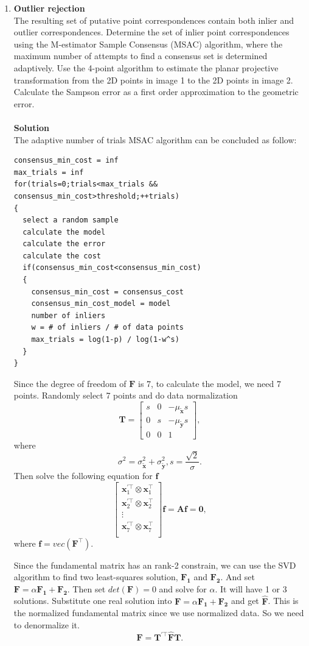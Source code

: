 \documentclass{../../assignment}
\begin{document}
\begin{problemlist}
\begin{enumerate}
\item \textbf{Outlier rejection}\\
The resulting set of putative point correspondences contain both inlier and outlier correspondences. Determine the set of inlier point correspondences using the M-estimator Sample Consensus (MSAC) algorithm, where the maximum number of attempts to find a consensus set is determined adaptively. Use the 4-point algorithm to estimate the planar projective transformation from the 2D points in image 1 to the 2D points in image 2. Calculate the Sampson error as a first order approximation to the geometric error.
\\\\
\textbf{Solution}\\
The adaptive number of trials MSAC algorithm can be concluded as follow:
\begin{lstlisting}
consensus_min_cost = inf
max_trials = inf
for(trials=0;trials<max_trials && consensus_min_cost>threshold;++trials)
{
  select a random sample
  calculate the model
  calculate the error
  calculate the cost
  if(consensus_min_cost<consensus_min_cost)
  {
    consensus_min_cost = consensus_cost
    consensus_min_cost_model = model
    number of inliers
    w = # of inliers / # of data points
    max_trials = log(1-p) / log(1-w^s)
  }
}
\end{lstlisting}
Since the degree of freedom of $\mathbf{F}$ is 7, to calculate the model, we need 7 points. Randomly select 7 points and do data normalization
$$
\mathbf{T}=
\begin{bmatrix}
s & 0 & -\mu_{\tilde{\mathbf{x}}}s\\
0 & s & -\mu_{\tilde{\mathbf{y}}}s\\
0 & 0 & 1
\end{bmatrix},
$$
where
$$
\sigma^2 = \sigma_{\tilde{\mathbf{x}}}^2 + \sigma_{\tilde{\mathbf{y}}}^2,
s = \frac{\sqrt{2}}{\sigma}.
$$
Then solve the following equation for $\mathbf{f}$
\[
\begin{bmatrix}
\mathbf{x}_1^{'\top} \otimes \mathbf{x}_1^{\top}\\
\mathbf{x}_2^{'\top} \otimes \mathbf{x}_2^{\top}\\
\vdots \\
\mathbf{x}_7^{'\top} \otimes \mathbf{x}_7^{\top}\\
\end{bmatrix}\mathbf{f}= \mathbf{A}\mathbf{f}=\mathbf{0},
\]
where $\mathbf{f} = vec(\mathbf{F^{\top}})$.

Since the fundamental matrix has an rank-2 constrain, we can use the SVD algorithm to find two least-squares solution, $\mathbf{F_1}$ and $\mathbf{F_2}$. And set $\mathbf{F} = \alpha \mathbf{F_1} + \mathbf{F_2}$. Then set $det(\mathbf{F}) = 0$ and solve for $\alpha$. It will have 1 or 3 solutions. Substitute one real solution into $\mathbf{F} = \alpha \mathbf{F_1} + \mathbf{F_2}$ and get $\hat{\mathbf{F}}$. This is the normalized fundamental matrix since we use normalized data. So we need to denormalize it.
$$
\mathbf{F} = \mathbf{T}^{'\top}\hat{\mathbf{F}}\mathbf{T}.
$$


\end{enumerate}
\end{problemlist}
\end{document}
